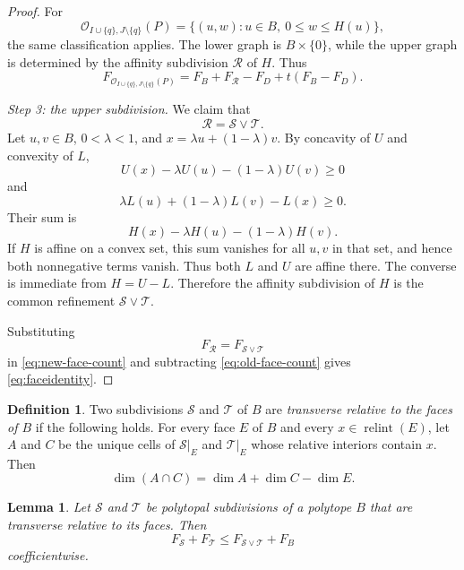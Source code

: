\documentclass[a4paper,12pt]{amsart}
\newtheorem{lemma}[theorem]{Lemma}
\theoremstyle{definition}
\newtheorem{definition}[theorem]{Definition}
\theoremstyle{remark}
\newcommand{\OO}{\mathcal O}
\newcommand{\relint}{\operatorname{relint}}
\begin{document}
\begin{proof}
For
\[
 \OO_{I\cup\{q\},J\setminus\{q\}}(P)  =\{(u,w):u\in B,\ 0\leq w\leq H(u)\},
\]
the same classification applies.
The lower graph is $B\times\{0\}$, while the upper graph is determined by the affinity subdivision $\mathcal R$ of $H$.
Thus
\begin{equation}\label{eq:new-face-count}
 F_{\OO_{I\cup\{q\},J\setminus\{q\}}(P)}  =F_B+F_{\mathcal R}-F_D+t(F_B-F_D).
\end{equation}

\smallskip
\noindent\emph{Step 3: the upper subdivision.}
We claim that
\[
 \mathcal R=\mathcal S\vee\mathcal T.
\]
Let $u,v\in B$, $0<\lambda<1$, and $x=\lambda u+(1-\lambda)v$.
By concavity of $U$ and convexity of $L$,
\[
 U(x)-\lambda U(u)-(1-\lambda)U(v)\geq0
\]
and
\[
 \lambda L(u)+(1-\lambda)L(v)-L(x)\geq0.
\]
Their sum is
\[
 H(x)-\lambda H(u)-(1-\lambda)H(v).
\]
If $H$ is affine on a convex set, this sum vanishes for all $u,v$ in that set, and hence both nonnegative terms vanish.
Thus both $L$ and $U$ are affine there.
The converse is immediate from $H=U-L$.
Therefore the affinity subdivision of $H$ is the common refinement $\mathcal S\vee\mathcal T$.

Substituting
\[
 F_{\mathcal R}=F_{\mathcal S\vee\mathcal T}
\]
in \eqref{eq:new-face-count} and subtracting \eqref{eq:old-face-count} gives \eqref{eq:faceidentity}.
\end{proof}


\begin{definition}\label{def:relative-transverse}
Two subdivisions $\mathcal S$ and $\mathcal T$ of $B$ are \emph{transverse relative to the faces of $B$} if the following holds.
For every face $E$ of $B$ and every $x\in\relint(E)$, let $A$ and $C$ be the unique cells of $\mathcal S|_E$ and $\mathcal T|_E$ whose relative interiors contain $x$.
Then
\begin{equation}\label{eq:transverse}
 \dim(A\cap C)=\dim A+\dim C-\dim E.
\end{equation}
\end{definition}


\begin{lemma}\label{lem:subdivision}
Let $\mathcal S$ and $\mathcal T$ be polytopal subdivisions of a polytope $B$ that are transverse relative to its faces.
Then
\begin{equation}\label{eq:subdivision-inequality}
 F_{\mathcal S}+F_{\mathcal T}\leq F_{\mathcal S\vee\mathcal T}+F_B
\end{equation}
coefficientwise.
\end{lemma}
\end{document}
